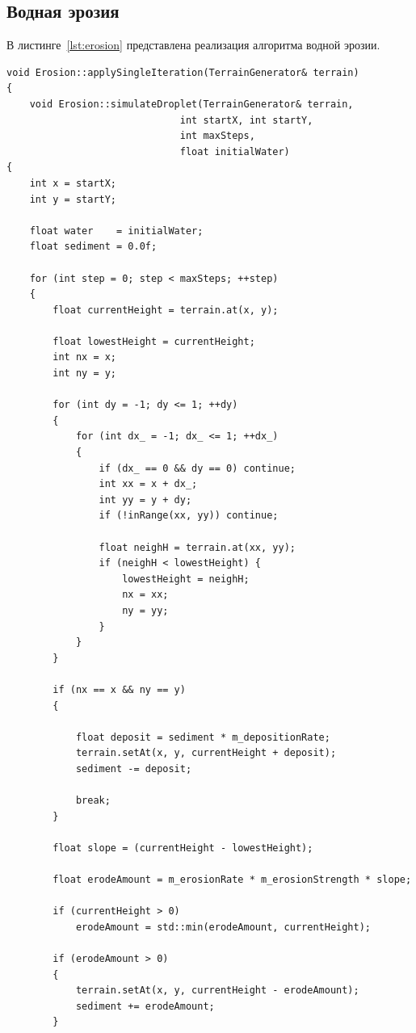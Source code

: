 \subsection{Водная эрозия}

В листинге~\ref{lst:erosion} представлена реализация алгоритма водной эрозии.

\begin{lstlisting}[style=cpp, label=lst:erosion, caption={Реализация функции водной эрозии}]
void Erosion::applySingleIteration(TerrainGenerator& terrain)
{
    void Erosion::simulateDroplet(TerrainGenerator& terrain,
                              int startX, int startY,
                              int maxSteps,
                              float initialWater)
{
    int x = startX;
    int y = startY;

    float water    = initialWater;
    float sediment = 0.0f;

    for (int step = 0; step < maxSteps; ++step)
    {
        float currentHeight = terrain.at(x, y);

        float lowestHeight = currentHeight;
        int nx = x;
        int ny = y;

        for (int dy = -1; dy <= 1; ++dy)
        {
            for (int dx_ = -1; dx_ <= 1; ++dx_)
            {
                if (dx_ == 0 && dy == 0) continue;
                int xx = x + dx_;
                int yy = y + dy;
                if (!inRange(xx, yy)) continue;

                float neighH = terrain.at(xx, yy);
                if (neighH < lowestHeight) {
                    lowestHeight = neighH;
                    nx = xx;
                    ny = yy;
                }
            }
        }

        if (nx == x && ny == y)
        {

            float deposit = sediment * m_depositionRate;
            terrain.setAt(x, y, currentHeight + deposit);
            sediment -= deposit;

            break;
        }

        float slope = (currentHeight - lowestHeight);

        float erodeAmount = m_erosionRate * m_erosionStrength * slope;

        if (currentHeight > 0)
            erodeAmount = std::min(erodeAmount, currentHeight);

        if (erodeAmount > 0)
        {
            terrain.setAt(x, y, currentHeight - erodeAmount);
            sediment += erodeAmount;
        }


\end{lstlisting}
